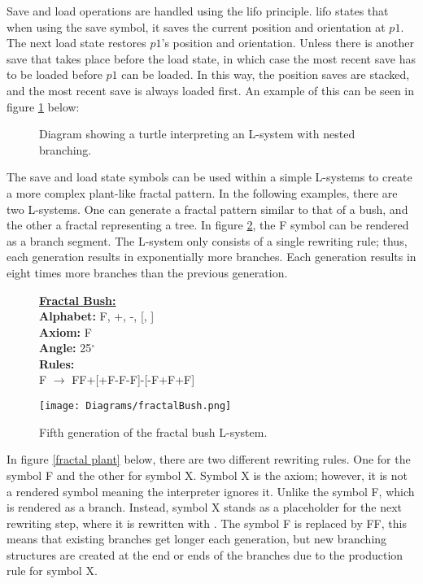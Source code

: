 \noindent
Save and load operations are handled using the \acrfull{lifo} principle. \acrshort{lifo} states that when using the save symbol, it saves the current position and orientation at $p1$. The next load state restores $p1$'s position and orientation. Unless there is another save that takes place before the load state, in which case the most recent save has to be loaded before $p1$ can be loaded. In this way, the position saves are stacked, and the most recent save is always loaded first. An example of this can be seen in figure \ref{branching 2} below:

\begin{figure}[htbp]
	{\centering
		\setlength{\fboxrule}{1pt}
		\vspace{7px}
		\caption{Diagram showing a turtle interpreting an L-system with nested branching.} \label{branching 2}
	}
\end{figure}
\FloatBarrier

\noindent
The save and load state symbols can be used within a simple L-systems to create a more complex plant-like fractal pattern. In the following examples, there are two L-systems. One can generate a fractal pattern similar to that of a bush, and the other a fractal representing a tree. In figure \ref{fractal bush}, the F symbol can be rendered as a branch segment. The L-system only consists of a single rewriting rule; thus, each generation results in exponentially more branches. Each generation results in eight times more branches than the previous generation. 

\begin{figure}[htbp]
	\raggedright
	\textbf{\underline{Fractal Bush:}} \\
	\textbf{Alphabet:} F, +, -, [, ] \\
	\textbf{Axiom:} F \\
	\textbf{Angle:} 25$^\circ$ \\
	\textbf{Rules:} \\
	F $\rightarrow$ FF+[+F-F-F]-[-F+F+F]\\
	{\centering
		\vspace{7px}
		\texttt{[image: Diagrams/fractalBush.png]}
		\caption{Fifth generation of the fractal bush L-system.} \label{fractal bush}
	}
\end{figure}
\FloatBarrier

\noindent
In figure \ref{fractal plant} below, there are two different rewriting rules. One for the symbol F and the other for symbol X. Symbol X is the axiom; however, it is not a rendered symbol meaning the interpreter ignores it. Unlike the symbol F, which is rendered as a branch. Instead, symbol X stands as a placeholder for the next rewriting step, where it is rewritten with . The symbol F is replaced by FF, this means that existing branches get longer each generation, but new branching structures are created at the end  or ends of the branches due to the production rule for symbol X.  

